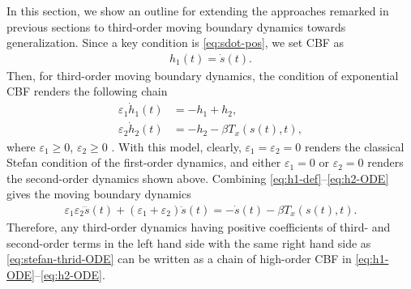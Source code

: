\documentclass[letterpaper, 10 pt, conference]{cls/ieeeconf}
\theoremstyle{definition}
\newcommand{\ep}{\varepsilon}
\begin{document}
In this section, we show an outline for extending the approaches remarked in previous sections to third-order moving boundary dynamics towards generalization. Since a key condition is \eqref{eq:sdot-pos}, we set CBF as 
\begin{align} \label{eq:h1-def}
    h_1(t) = \dot s(t).  
\end{align}
Then, for third-order moving boundary dynamics, the condition of exponential CBF renders the following chain 
\begin{align} \label{eq:h1-ODE}
    \ep_1 \dot h_1(t) &= - h_1 + h_2, \\
 \label{eq:h2-ODE}  \ep_2 \dot h_2(t) &= - h_{2} - \beta T_x(s(t),t), 
\end{align}
where $\ep_1 \geq 0$, $\ep_2\geq 0$
. With this model, clearly, $\ep_1 = \ep_2 = 0$
renders the classical Stefan condition of the first-order dynamics, and either $\ep_1 = 0$ or $\ep_2 = 0$
renders the second-order dynamics shown above. Combining \eqref{eq:h1-def}--\eqref{eq:h2-ODE} gives the moving boundary dynamics
\begin{align}
   \ep_1 \ep_2 \dddot s(t) + ( \ep_1 + \ep_2) \ddot s(t) = - \dot s(t) - \beta T_x(s(t),t). \label{eq:stefan-thrid-ODE}
\end{align}
Therefore, any third-order dynamics having positive coefficients of third- and second-order terms in the left hand side with the same right hand side as \eqref{eq:stefan-thrid-ODE} can be written as a chain of high-order CBF in \eqref{eq:h1-ODE}--\eqref{eq:h2-ODE}. 

\end{document}
